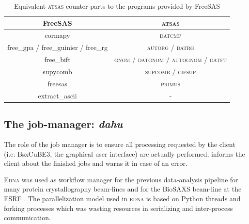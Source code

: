 \documentclass[preprint]{iucr}              %
\begin{document}
\begin{table}
    \label{freesas-atsas}
    \caption{Equivalent \textsc{atsas} counter-parts to the programs provided by FreeSAS }
    \begin{center}
    \begin{tabular}{|c|c|}
        \hline
        FreeSAS & \textsc{atsas} \\
        \hline
        cormapy & \textsc{datcmp}\\
        free\_gpa / free\_guinier / free\_rg& \textsc{autorg} / \textsc{datrg}\\
        free\_bift& \textsc{gnom} / \textsc{datgnom} / \textsc{autognom} / \textsc{datft}\\
        supycomb& \textsc{supcomb} / \textsc{cifsup} \\
        freesas& \textsc{primus}\\
        extract\_ascii& - \\
        \hline
    \end{tabular}
    \end{center}
    
\end{table}

\subsection{The job-manager: \textit{dahu}}

The role of the job manager is to ensure all processing requested by the client (i.e. BsxCuBE3, the graphical user interface) are actually performed, informs the client about the finished jobs and warns it in case of an error.


\textsc{Edna} was used as workflow manager for the previous data-analysis pipeline for many protein crystallography beam-lines \cite{edna} and for the BioSAXS beam-line at the ESRF \cite{BM29ODA}.
The parallelization model used in \textsc{edna} is based on Python threads and forking processes which was wasting resources in serializing and inter-process communication. 
 
\end{document}
